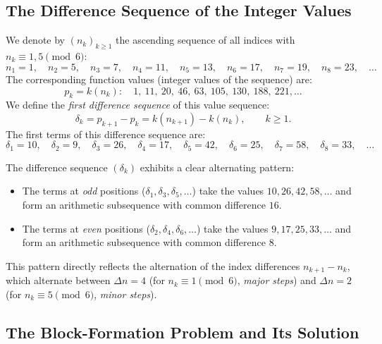 \subsection{The Difference Sequence of the Integer Values}
\label{subsec:differenzstruktur}

We denote by $(n_k)_{k \geq 1}$ the ascending sequence of all
indices with $n_k \equiv 1, 5 \pmod{6}$:
\[
  n_1 = 1,\quad n_2 = 5,\quad n_3 = 7,\quad n_4 = 11,\quad
  n_5 = 13,\quad n_6 = 17,\quad n_7 = 19,\quad n_8 = 23,\quad \ldots
\]
The corresponding function values (integer values of the sequence) are:
\[
  p_k = k(n_k)\colon\quad 1,\ 11,\ 20,\ 46,\ 63,\ 105,\ 130,\ 188,\ 221,\ldots
\]
We define the \emph{first difference sequence} of this value sequence:
\[
  \delta_k = p_{k+1} - p_k = k(n_{k+1}) - k(n_k),\qquad k \geq 1.
\]
The first terms of this difference sequence are:
\[
  \delta_1 = 10,\quad \delta_2 = 9,\quad \delta_3 = 26,\quad
  \delta_4 = 17,\quad \delta_5 = 42,\quad \delta_6 = 25,\quad
  \delta_7 = 58,\quad \delta_8 = 33,\quad \ldots
\]

\begin{remark}
The difference sequence $(\delta_k)$ exhibits a clear alternating pattern:
\begin{itemize}
  \item The terms at \emph{odd} positions ($\delta_1, \delta_3, \delta_5, \ldots$)
        take the values $10, 26, 42, 58, \ldots$ and form an arithmetic subsequence
        with common difference $16$.
  \item The terms at \emph{even} positions ($\delta_2, \delta_4, \delta_6, \ldots$)
        take the values $9, 17, 25, 33, \ldots$ and form an arithmetic subsequence
        with common difference $8$.
\end{itemize}
This pattern directly reflects the alternation of the index differences
$n_{k+1} - n_k$, which alternate between $\Delta n = 4$ (for
$n_k \equiv 1 \pmod{6}$, \emph{major steps}) and $\Delta n = 2$ (for
$n_k \equiv 5 \pmod{6}$, \emph{minor steps}).
\end{remark}

\subsection{The Block-Formation Problem and Its Solution}
\label{subsec:gruppenbildung}

